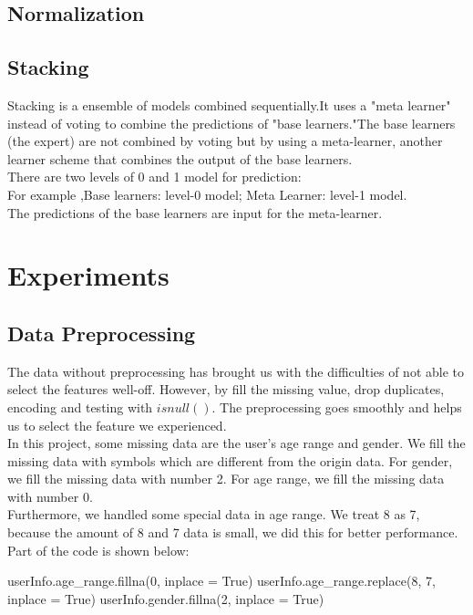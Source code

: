 \documentclass[sigconf]{acmart}
\begin{document}
\subsection{Normalization}
\subsection{Stacking}
Stacking is a ensemble of models combined sequentially.It uses a "meta learner" instead of voting to combine the predictions of "base learners."The base learners (the expert) are not combined by voting but by using a meta-learner, another learner scheme that combines the output of the base learners.\\
\indent There are two levels of 0 and 1 model for prediction:\\
\indent For example ,Base learners: level-0 model; Meta Learner: level-1 model.\\
\indent The predictions of the base learners are input for the meta-learner.

\section{Experiments}
\subsection{Data Preprocessing}
The data without preprocessing has brought us with the difficulties of not able to select the features well-off. However, by fill the missing value, drop duplicates, encoding and testing with $isnull()$. The preprocessing goes smoothly and helps us to select the feature we experienced. \\
\indent
In this project, some missing data are the user's age range and gender. We fill the missing data with symbols which are different from the origin data. For gender, we fill the missing data with number 2. For age range, we fill the missing data with number 0.\\
\indent
Furthermore, we handled some special data in age range. We treat 8 as 7, because the amount of 8 and 7 data is small, we did this for better performance. \\
\indent
Part of the code is shown below:
\begin{python}
userInfo.age_range.fillna(0, inplace = True)
userInfo.age_range.replace(8, 7, inplace = True)
userInfo.gender.fillna(2, inplace = True)
\end{python}
\end{document}
